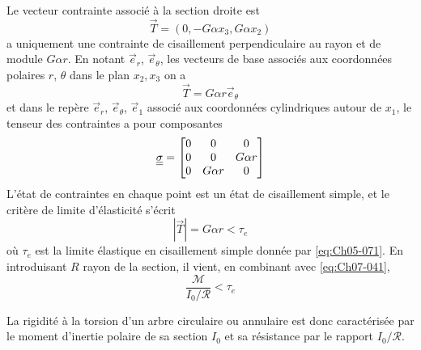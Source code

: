Le vecteur contrainte associé à la section droite est
\begin{equation}
    \vec{T} = \left( 0, -G\alpha x_3, G \alpha x_2 \right)
    \label{eq:Ch07-042}
\end{equation}
a uniquement une contrainte de cisaillement perpendiculaire au rayon et de module $G\alpha r$.
En notant $\vec{e}_r$, $\vec{e}_{\theta}$, les vecteurs de base associés aux coordonnées polaires $r$, $\theta$ dans le plan $x_2,x_3$ on a
\begin{equation}
    \vec{T} = G \alpha r \vec{e}_{\theta} 
    \label{eq:Ch07-043}
\end{equation}
et dans le repère $\vec{e}_r$, $\vec{e}_{\theta}$, $\vec{e}_{1}$ associé aux coordonnées cylindriques autour de $x_1$, le tenseur des contraintes a pour composantes
\begin{equation}
    \underline{\underline{\sigma}} = 
    \begin{bmatrix}
        0 & 0 & 0\\
        0 & 0 & G\alpha r\\
        0 & G\alpha r & 0
    \end{bmatrix}
    \label{eq:Ch07-044}
\end{equation}
L'état de contraintes en chaque point est un état de cisaillement simple, et le critère de limite d'élasticité s'écrit
\begin{equation}
    |\vec{T}| = G \alpha r < \tau_e    
    \label{eq:Ch07-045} 
\end{equation}
où $\tau_e$ est la limite élastique en cisaillement simple donnée par \eqref{eq:Ch05-071}.
En introduisant $R$ rayon de la section, il vient, en combinant avec \eqref{eq:Ch07-041},
\begin{equation}
    \frac{\mathcal{M}}{I_0/\mathcal{R}} < \tau_e    
    \label{eq:Ch07-046} 
\end{equation}

La rigidité à la torsion d'un arbre circulaire ou annulaire est donc caractérisée par le moment d'inertie polaire de sa section $I_0$ et sa résistance par le rapport $I_0/\mathcal{R}$.

